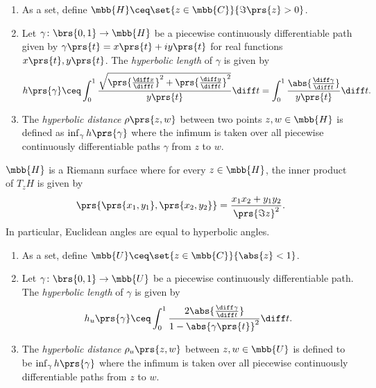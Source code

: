 \documentclass[10pt, twoside]{book}
\begin{document}
\begin{definition}
\begin{enumerate}
\item As a set, define $\mbb{H} \ceq \set{z \in \mbb{C}}{\Im\prs{z} > 0}$.
\item Let $\gamma \colon \brs{0,1} \to \mbb{H}$ be a piecewise continuously differentiable path given by $\gamma\prs{t} = x\prs{t} + iy\prs{t}$ for real functions $x\prs{t}, y\prs{t}$.
The \emph{hyperbolic length} of $\gamma$ is given by
\[h\prs{\gamma} \ceq \int_0^1 \frac{\sqrt{\prs{\frac{\diff x}{\diff t}}^2 + \prs{\frac{\diff y}{\diff t}}^2}}{y\prs{t}} \diff t = \int_0^1 \frac{\abs{\frac{\diff \gamma}{\diff t}}}{y\prs{t}} \diff t \text{.}\]
\item The \emph{hyperbolic distance} $\rho\prs{z,w}$ between two points $z,w \in \mbb{H}$ is defined as $\inf_\gamma h\prs{\gamma}$ where the infimum is taken over all piecewise continuously differentiable paths $\gamma$ from $z$ to $w$.
\end{enumerate}
\end{definition}

\begin{remark}
$\mbb{H}$ is a Riemann surface where for every $z \in \mbb{H}$, the inner product of $T_z H$ is given by
\[\prs{\prs{x_1, y_1},\prs{x_2,y_2}} = \frac{x_1 x_2 + y_1 y_2}{\prs{\Im z}^2} \text{.}\]
In particular, Euclidean angles are equal to hyperbolic angles.
\end{remark}

\begin{definition}
\begin{enumerate}
\item As a set, define $\mbb{U} \ceq \set{z \in \mbb{C}}{\abs{z} < 1}$.
\item Let $\gamma \colon \brs{0,1} \to \mbb{U}$ be a piecewise continuously differentiable path. The \emph{hyperbolic length} of $\gamma$ is given by
\[h_u\prs{\gamma} \ceq \int_0^1 \frac{2 \abs{\frac{\diff \gamma}{\diff t}}}{1 - \abs{\gamma\prs{t}}^2} \diff t \text{.}\]

\item The \emph{hyperbolic distance} $\rho_u\prs{z,w}$ between $z,w \in \mbb{U}$ is defined to be $\inf_\gamma h\prs{\gamma}$ where the infimum is taken over all piecewise continuously differentiable paths from $z$ to $w$.
\end{enumerate}
\end{definition}
\end{document}
